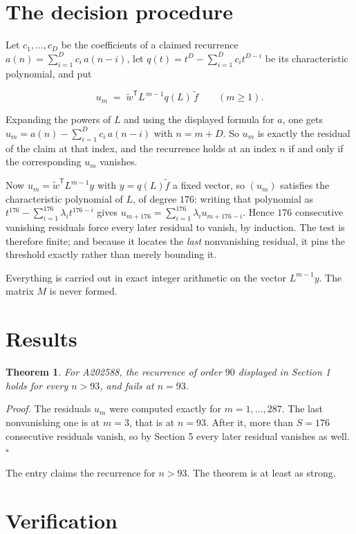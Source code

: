 \documentclass[11pt]{article}
\newtheorem{theorem}{Theorem}
\theoremstyle{definition}
\begin{document}
\section{The decision procedure}

Let $c_1,\dots,c_D$ be the coefficients of a claimed recurrence $a(n) = \sum_{i=1}^{D} c_i\,a(n-i)$, let $q(t) = t^{D} - \sum_{i=1}^{D} c_i t^{D-i}$ be its characteristic polynomial, and put

\[u_m \;=\; \tilde w^{\mathsf T} L^{\,m-1} q(L)\,\tilde f \qquad (m \ge 1).\]

Expanding the powers of $L$ and using the displayed formula for $a$, one gets $u_m = a(n) - \sum_{i=1}^{D} c_i\,a(n-i)$ with $n = m + D$. So $u_m$ is exactly the residual of the claim at that index, and the recurrence holds at an index $n$ if and only if the corresponding $u_m$ vanishes.

Now $u_m = \tilde w^{\mathsf T} L^{m-1} y$ with $y = q(L)\tilde f$ a fixed vector, so $(u_m)$ satisfies the characteristic polynomial of $L$, of degree $176$: writing that polynomial as $t^{176} - \sum_{i=1}^{176} \lambda_i t^{176-i}$ gives $u_{m+176} = \sum_{i=1}^{176} \lambda_i u_{m+176-i}$. Hence $176$ consecutive vanishing residuals force every later residual to vanish, by induction. The test is therefore finite; and because it locates the {\itshape last} nonvanishing residual, it pins the threshold exactly rather than merely bounding it.

Everything is carried out in exact integer arithmetic on the vector $L^{m-1}y$. The matrix $M$ is never formed.

\section{Results}

\begin{theorem} For A202588, the recurrence of order $90$ displayed in Section 1 holds for every $n > 93$, and fails at $n = 93$.\end{theorem}

{\itshape Proof.} The residuals $u_m$ were computed exactly for $m = 1,\dots,287$. The last nonvanishing one is at $m = 3$, that is at $n = 93$. After it, more than $S = 176$ consecutive residuals vanish, so by Section 5 every later residual vanishes as well. $\square$

The entry claims the recurrence for $n > 93$. The theorem is at least as strong.

\section{Verification}
\end{document}
